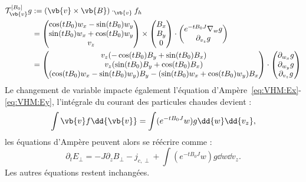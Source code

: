 \begin{equation}
  \begin{aligned}
    \mathcal{T}_{\vb{v}}^{[B_0]}g &:= (\vb{v}\times\vb{B})\cdot_{\vb{v}}f_h \\
                                  & = \begin{pmatrix}
                                    \cos(tB_0)w_x - \sin(tB_0)w_y \\
                                    \sin(tB_0)w_x + \cos(tB_0)w_y \\
                                    v_z
                                  \end{pmatrix}
                                  \times
                                  \begin{pmatrix}
                                     B_x \\ B_y \\ 0
                                  \end{pmatrix} 
                                  \cdot
                                  \begin{pmatrix}
                                    e^{-tB_0J}\nabla_w g \\
                                    \partial_{v_z}g
                                  \end{pmatrix} \\
                                  & = \begin{pmatrix}
                                    v_z(-\cos(tB_0)B_y + \sin(tB_0)B_x) \\
                                    v_z(\sin(tB_0)B_y + \cos(tB_0)B_x) \\
                                    (\cos(tB_0)w_x-\sin(tB_0)w_y)B_y - (\sin(tB_0)w_x+\cos(tB_0)w_y)B_x
                                  \end{pmatrix}
                                  \cdot
                                  \begin{pmatrix}
                                    \partial_{w_x}g \\
                                    \partial_{w_y}g \\
                                    \partial_{v_z}g
                                  \end{pmatrix}
  \end{aligned}
\end{equation}
Le changement de variable impacte également l'équation d'Ampère~\eqref{eq:VHM:Ex}-\eqref{eq:VHM:Ey}, l'intégrale du courant des particules chaudes devient :
$$
  \int\vb{v}f\dd{\vb{v}} = \int(e^{-tB_0J}w)g\dd{w}\dd{v_z},
$$
les équations d'Ampère peuvent alors se réécrire comme :
\begin{equation}
  \partial_t E_\perp = -J\partial_z B_\perp - j_{c,\perp} + \int (e^{-tB_0J}w)g\dd{w}\dd{v_z}.
\end{equation}
Les autres équations restent  inchangées.

